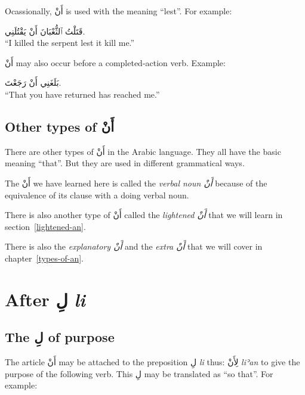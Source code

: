 \documentclass[
  10pt,
]{book}
\begin{document}
Ocassionally, \foreignlanguage{arabic}{أَنْ} is used with the meaning \enquote{lest}. For example:

\foreignlanguage{arabic}{قَتَلْتُ ٱلثُّعْبَانَ أَنْ يَقْتُلَنِي.}\\
\enquote{I killed the serpent lest it kill me.}

\foreignlanguage{arabic}{أَنْ} may also occur before a completed-action verb. Example:

\foreignlanguage{arabic}{بَلَغَنِي أَنْ رَجَعْتَ.}\\
\enquote{That you have returned has reached me.}

\subsection{\texorpdfstring{Other types of \foreignlanguage{arabic}{أَنْ}}{Other types of أَنْ}}\label{other-types-of-ux623ux646}

There are other types of \foreignlanguage{arabic}{أَنْ} in the Arabic language. They all have the basic meaning \enquote{that}. But they are used in different grammatical ways.

The \foreignlanguage{arabic}{أَنْ} we have learned here is called the \emph{verbal noun \foreignlanguage{arabic}{أَنْ}} because of the equivalence of its clause with a doing verbal noun.

There is also another type of \foreignlanguage{arabic}{أَنْ} called the \emph{lightened \foreignlanguage{arabic}{أَنْ}} that we will learn in section~\ref{lightened-an}.

There is also the \emph{explanatory \foreignlanguage{arabic}{أَنْ}} and the \emph{extra \foreignlanguage{arabic}{أَنْ}} that we will cover in chapter~\ref{types-of-an}.

\section{\texorpdfstring{After \foreignlanguage{arabic}{لِ} \emph{li}}{After لِ li}}\label{after-ux644-li}

\subsection{\texorpdfstring{The \foreignlanguage{arabic}{لِ} of purpose}{The لِ of purpose}}\label{the-ux644-of-purpose}

The article \foreignlanguage{arabic}{أَنْ} may be attached to the preposition \foreignlanguage{arabic}{لِ} \emph{li} thus: \foreignlanguage{arabic}{لِأَنْ} \emph{liʾan} to give the purpose of the following verb. This \foreignlanguage{arabic}{لِ} may be translated as \enquote{so that}. For example:
\end{document}

